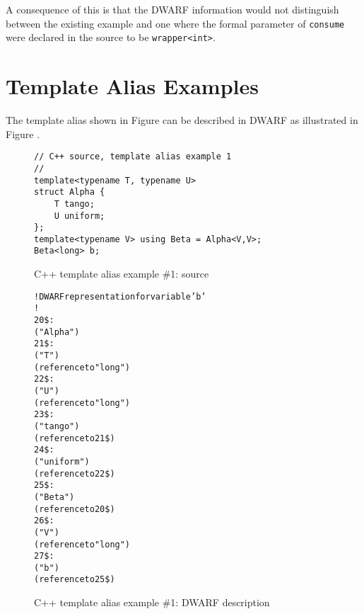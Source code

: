 A consequence of this is that the DWARF information would
not distinguish between the existing example and one where
the formal parameter of \texttt{consume} were declared in the source to be
\texttt{wrapper\textless int\textgreater}.


\section{Template Alias Examples}
\label{app:templatealiasexample}

The  template alias shown in
Figure 
can be described in DWARF as illustrated 
 in 
Figure .

\begin{figure}[h]
\begin{lstlisting}
// C++ source, template alias example 1
//
template<typename T, typename U>
struct Alpha {
    T tango;
    U uniform;
};
template<typename V> using Beta = Alpha<V,V>;
Beta<long> b;
\end{lstlisting}
\caption{C++ template alias example \#1: source}
\label{fig:ctemplatealiasexample1source}
\end{figure}

\begin{figure}[h]
\begin{dwflisting}
\begin{alltt}
! DWARF representation for variable 'b'
!
20\$:  \DWTAGstructuretype
          \DWATname("Alpha")
21\$:      \DWTAGtemplatetypeparameter
              \DWATname("T")
              \DWATtype(reference to "long")
22\$:      \DWTAGtemplatetypeparameter
              \DWATname("U")
              \DWATtype(reference to "long")
23\$:      \DWTAGmember
              \DWATname("tango")
              \DWATtype(reference to 21\$)
24\$:      \DWTAGmember
              \DWATname("uniform")
              \DWATtype(reference to 22\$)
25\$:  \DWTAGtemplatealias
          \DWATname("Beta")
          \DWATtype(reference to 20\$)
26\$:      \DWTAGtemplatetypeparameter
              \DWATname("V")
              \DWATtype(reference to "long")
27\$:  \DWTAGvariable
          \DWATname("b")
          \DWATtype(reference to 25\$)
\end{alltt}
\end{dwflisting}
\caption{C++ template alias example \#1: DWARF description}
\label{fig:ctemplatealiasexample1dwarf}
\end{figure}

